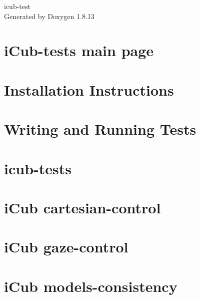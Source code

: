 \documentclass[twoside]{book}
\newcommand{\+}{\discretionary{\mbox{\scriptsize$\hookleftarrow$}}{}{}}
\newcommand{\clearemptydoublepage}{%
  \newpage{\pagestyle{empty}\cleardoublepage}%
}
\begin{document}
\begin{titlepage}
\vspace*{7cm}
\begin{center}%
{\Large icub-\/test }\\
\vspace*{1cm}
{\large Generated by Doxygen 1.8.13}\\
\end{center}
\end{titlepage}
\clearemptydoublepage
{}
\tableofcontents
\clearemptydoublepage
{}

\chapter{i\+Cub-\/tests main page}
\label{index}\hypertarget{index}{}
\chapter{Installation Instructions}
\label{installation}

\chapter{Writing and Running Tests}
\label{writing-and-running}

\chapter{icub-\/tests}
\label{md_C_1_dev_icub-tests_README}

\chapter{i\+Cub cartesian-\/control}
\label{md_C_1_dev_icub-tests_src_cartesian-control_README}

\chapter{i\+Cub gaze-\/control}
\label{md_C_1_dev_icub-tests_src_gaze-control_README}

\chapter{i\+Cub models-\/consistency}
\label{md_C_1_dev_icub-tests_src_models-consistency_README}

\end{document}
